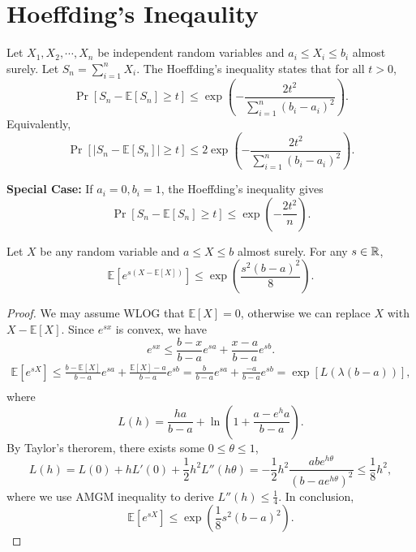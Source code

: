 \section{Hoeffding's Ineqaulity}
\label{sec:hoeffding}

Let $X_1,X_2,\cdots,X_n$ be independent random variables and $a_i \leq X_i \leq b_i$ almost surely. Let $S_n=\sum_{i=1}^nX_i$. The Hoeffding's inequality states that for all $t > 0$,
\[
	\Pr[S_n - \mathbb{E}[S_n] \geq t] \leq \exp\left( -\frac{2t^2}{\sum_{i=1}^n (b_i - a_i)^2} \right).
\]
Equivalently,
\[
	\Pr[ |S_n - \mathbb{E}[S_n] |\geq t] \leq 2\exp\left( -\frac{2t^2}{\sum_{i=1}^n (b_i - a_i)^2} \right).
\]

\noindent \textbf{Special Case:} If $a_i=0, b_i=1$, the Hoeffding's inequality gives
\[
	\Pr[S_n - \mathbb{E}[S_n] \geq t] \leq \exp \left( -\frac{2t^2}{n} \right).
\]

\begin{lemma}

Let $X$ be any random variable and $a\leq X \leq b$ almost surely. For any $s \in \mathbb{R}$,
\[
	\mathbb{E}[e^{s(X - \mathbb{E}[X])}] \leq \exp \left( \frac{s^2(b-a)^2}{8} \right).
\]
\end{lemma}

\begin{proof}

We may assume WLOG that $\mathbb{E}[X] = 0$, otherwise we can replace $X$ with $X-\mathbb{E}[X]$. Since $e^{sx}$ is convex, we have
\[
	e^{sx} \leq \frac{b-x}{b-a}e^{sa} + \frac{x-a}{b-a}e^{sb}.
\]
\[
\begin{aligned}
	\mathbb{E}[e^{sX}] \leq \frac{b-\mathbb{E}[X]}{b-a}e^{sa} + \frac{\mathbb{E}[X]-a}{b-a}e^{sb} = \frac{b}{b-a}e^{sa} + \frac{-a}{b-a}e^{sb} = \exp\left[ L(\lambda(b-a)) \right], \\
\end{aligned} 
\]
where
\[
	L(h) = \frac{ha}{b-a} + \ln \left( 1 +\frac{a - e^h a}{b-a} \right).
\]
By Taylor's therorem, there exists some $0 \leq \theta \leq 1$,
\[
	L(h) = L(0) + hL'(0) + \frac{1}{2}h^2L''(h\theta) = -\frac{1}{2}h^2\frac{abe^{h\theta}}{(b - ae^{h\theta})^2} \leq \frac{1}{8}h^2,
\]
where we use AMGM inequality to derive $L''(h) \leq \frac{1}{4}$. In conclusion,
\[
	\mathbb{E}[e^{sX}] \leq \exp\left( \frac{1}{8}s^2(b-a)^2 \right).
\]
\end{proof}

